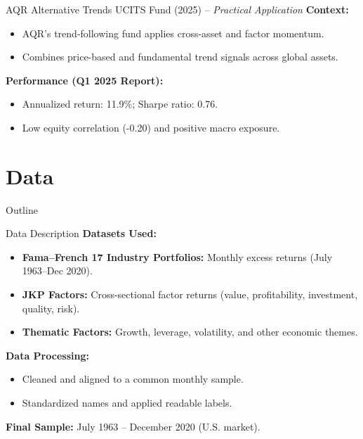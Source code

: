 \documentclass[t]{beamer}
\begin{document}
\begin{frame}{AQR Alternative Trends UCITS Fund (2025) -- \textit{Practical Application}}
\textbf{Context:}
\begin{itemize}
    \item AQR’s trend-following fund applies cross-asset and factor momentum.
    \item Combines price-based and fundamental trend signals across global assets.
\end{itemize}

\textbf{Performance (Q1 2025 Report):}
\begin{itemize}
    \item Annualized return: 11.9\%; Sharpe ratio: 0.76.
    \item Low equity correlation (-0.20) and positive macro exposure.
\end{itemize}
\end{frame}

\section{Data}

\begin{frame}{Outline}
\end{frame}

\begin{frame}{Data Description}
\textbf{Datasets Used:}
\begin{itemize}
    \item \textbf{Fama–French 17 Industry Portfolios:} Monthly excess returns (July 1963–Dec 2020).
    \item \textbf{JKP Factors:} Cross-sectional factor returns (value, profitability, investment, quality, risk).
    \item \textbf{Thematic Factors:} Growth, leverage, volatility, and other economic themes.
\end{itemize}

\textbf{Data Processing:}
\begin{itemize}
    \item Cleaned and aligned to a common monthly sample.
    \item Standardized names and applied readable labels.
\end{itemize}

\textbf{Final Sample:} July 1963 – December 2020 (U.S. market).
\end{frame}
\end{document}
